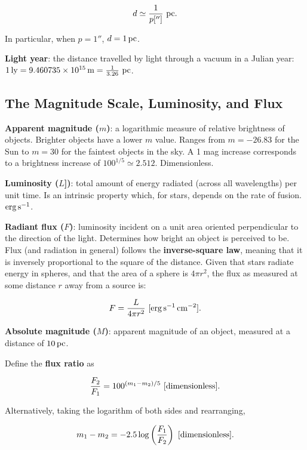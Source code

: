 \documentclass[a4paper,10pt]{article}
\begin{document}
\begin{align*}
    d \simeq \frac{1}{p['']} ~ {\rm pc}.
\end{align*}

In particular, when $p = 1''$, $d = 1\,{\rm pc}$.

\textbf{Light year}: the distance travelled by light through a vacuum in a Julian year: $1\,{\rm ly} = 9.460735\times 10^{15}\,{\rm m} = \frac{1}{3.26}~{\rm pc}$.

\subsection{The Magnitude Scale, Luminosity, and Flux}

\textbf{Apparent magnitude ($m$)}: a logarithmic measure of relative brightness of objects. Brighter objects have a lower $m$ value. Ranges from $m=-26.83$ for the Sun to $m=30$ for the faintest objects in the sky. A 1 mag increase corresponds to a brightness increase of $100^{1/5} \simeq 2.512$. Dimensionless. 

\textbf{Luminosity ($L$])}: total amount of energy radiated (across all wavelengths) per unit time. Is an intrinsic property which, for stars, depends on the rate of fusion. $\rm erg\,s^{-1}$. 

\textbf{Radiant flux ($F$)}: luminosity incident on a unit area oriented perpendicular to the direction of the light. Determines how bright an object is perceived to be. Flux (and radiation in general) follows the \textbf{inverse-square law}, meaning that it is inversely proportional to the square of the distance. Given that stars radiate energy in spheres, and that the area of a sphere is $4\pi r^2$, the flux as measured at some distance $r$ away from a source is:

\begin{align*}
    F = \frac{L}{4\pi r^2}~[{\rm erg\,s^{-1}\,cm^{-2}}].
\end{align*}

\textbf{Absolute magnitude ($M$)}: apparent magnitude of an object, measured at a distance of $10\,{\rm pc}$.

Define the \textbf{flux ratio} as 

\begin{align*}
    \frac{F_2}{F_1} = 100^{(m_1-m_2)/5}~[{\rm dimensionless}].
\end{align*}

Alternatively, taking the logarithm of both sides and rearranging, 

\begin{align*}
    m_1 - m_2 = -2.5\log\left(\frac{F_1}{F_2}\right)~[{\rm dimensionless}].
\end{align*}
\end{document}
